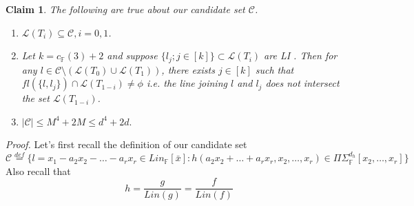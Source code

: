 \documentclass[letterpaper,USenglish,numberwithinsect]{lipics}
\newcommand{\eqdef}{\stackrel{def}{=}}
\newcommand{\F}{\mathbb{F}}
\newcommand{\ML}{\mathcal{L}}
\newcommand{\MC}{\mathcal{C}}
\newcommand{\B}[1]{\bar{#1}}
\newtheorem{claim}[theorem]{Claim}
\begin{document}
\begin{claim}\label{candidate}
The following are true about our candidate set $\MC$.
\begin{enumerate}
\item $\ML(T_i)\subseteq \MC, i=0,1$.
\item \label{candidateprop} Let $k=c_{\F}(3)+2$ and suppose $\{ l_{j} ; j\in
[k]\} \subset \ML(T_i)$ are LI . Then for any
$l\in \MC\setminus (\ML(T_0)\cup \ML(T_1))$, there exists $j\in [k]$
such that $fl(\{l,l_{j}\})\cap \ML(T_{1-i}) \neq \phi$ i.e. the line joining $l$
and $l_{j}$ does not intersect the set $\ML(T_{1-i})$.
\item $|\MC|\leq M^4+2M\leq d^4 + 2d.$
\end{enumerate}
\end{claim}


\emph{Proof.}
Let's first recall the definition of our candidate set
\[
\MC \eqdef \{l = x_1-a_2x_2-\ldots- a_rx_r \in Lin_{\F}[\B{x}] :
h(a_2x_2+\ldots + a_rx_r,x_2,\ldots,x_r) \in \Pi\Sigma^{d_h}_\F[x_2,\ldots,x_r]
\}
\]
Also recall that
\[
 h = \frac{g}{Lin(g)} = \frac{f}{Lin(f)}
\]
\end{document}
